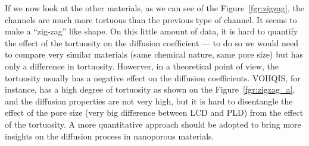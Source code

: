 \documentclass[main]{subfiles}
\begin{document}
If we now look at the other materials, as we can see of the Figure~\ref{fgr:zigzag}, the channels are much more tortuous than the previous type of channel. It seems to make a ``zig-zag'' like shape. On this little amount of data, it is hard to quantify the effect of the tortuosity on the diffusion coefficient --- to do so we would need to compare very similar materials (same chemical nature, same pore size) but has only a difference in tortuosity. Howerver, in a theoretical point of view, the tortuosity usually has a negative effect on the diffusion coefficients. VOHQIS, for instance, has a high degree of tortuosity as shown on the Figure~\ref{fgr:zigzag_a}, and the diffusion properties are not very high, but it is hard to disentangle the effect of the pore size (very big difference between LCD and PLD) from the effect of the tortuosity. A more quantitative approach should be adopted to bring more insights on the diffusion process in nanoporous materials. 
\end{document}
